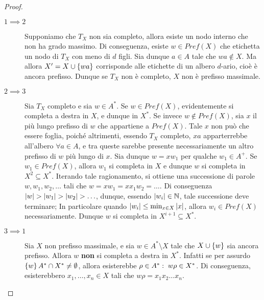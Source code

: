 \begin{proof}
  \begin{description}
    \item[\(1 \implies 2\)]
      Supponiamo che \(T_X\) non sia completo, allora esiste un nodo interno che non ha grado massimo.
      Di conseguenza, esiste \(w \in Pref(X)\) che etichetta un nodo di \(T_X\) con meno di \(d\) figli.
      Sia dunque \(a \in A\) tale che \(wa \not\in X\). Ma allora \(X' = X \cup \set{wa}\) corrisponde alle etichette di un albero \(d\)-ario, cioè è ancora prefisso.
      Dunque se \(T_X\) non è completo, \(X\) non è prefisso massimale.
    \item[\(2 \implies 3\)]
      Sia \(T_X\) completo e sia \(w \in A^*\). Se \(w \in Pref(X)\), evidentemente si completa a destra in \(X\), e dunque in \(X^*\).
      Se invece \(w \not\in Pref(X)\), sia \(x\) il più lungo prefisso di \(w\) che appartiene a \(Pref(X)\).
      Tale \(x\) non può che essere foglia, poiché altrimenti, essendo \(T_X\) completo, \(xa\) apparterrebbe all'albero \(\forall a \in A\), e tra queste sarebbe presente necessariamente un altro prefisso di \(w\) più lungo di \(x\).
      Sia dunque \(w=xw_1\) per qualche \(w_1 \in A^+\). Se \(w_1\in Pref(X)\), allora \(w_1\) si completa in \(X\) e dunque \(w\) si completa in \(X^2\subseteq X^*\).
      Iterando tale ragionamento, si ottiene una successione di parole \(w, w_1, w_2, \ldots\) tali che \(w = x w_1 = x x_1 w_2 = \ldots\).
      Di conseguenza \(\left|w\right| > \left|w_1\right| > \left|w_2\right| > \ldots\), dunque, essendo \(\left|w_i\right| \in \mathbb{N}\), tale successione deve terminare;
      In particolare quando \(\left|w_i\right|\leq \min_{x\in X}\left|x\right|\), allora \(w_i \in Pref(X)\) necessariamente.
      Dunque \(w\) si completa in \(X^{i+1} \subseteq X^*\).
    \item[\(3 \implies 1\)]
      Sia \(X\) non prefisso massimale, e sia \(w \in A^*\setminus X\) tale che \(X \cup \set{w}\) sia ancora prefisso.
      Allora \(w\) \textbf{non} si completa a destra in \(X^*\).
      Infatti se per assurdo \(\set{w}A^* \cap X^* \neq \emptyset\), allora esisterebbe \(\rho \in A^*:\; w\rho \in X^*\).
      Di conseguenza, esisterebbero \(x_1,\ldots,x_n \in X\) tali che \(w\rho = x_1 x_2 \ldots x_n\).
      \begin{figure}[H]
    \centering
\end{figure}
\end{description}
\end{proof}

